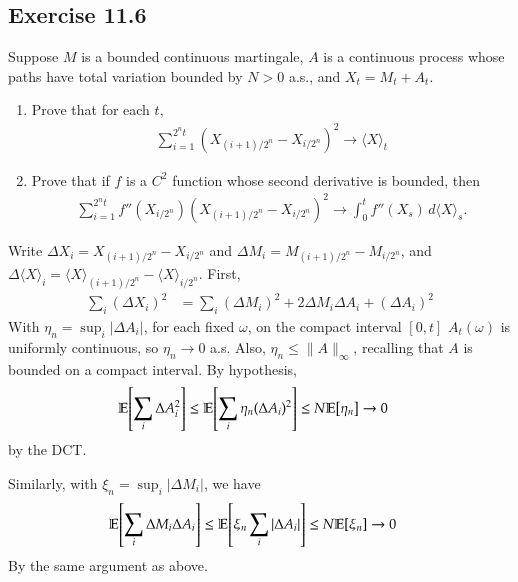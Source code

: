 \documentclass[12pt]{article}
\theoremstyle{definitionstyle}
\newcommand{\mg}[1]{\| #1 \|}
\newcommand{\1}{\mathds 1}
\newcommand{\E}{\mathbb E \qty}
\newcommand{\qv}[1]{\langle #1 \rangle}
\begin{document}
    \subsection*{Exercise 11.6}
    Suppose $M$ is a bounded continuous martingale, $A$ is a continuous process whose paths have total variation bounded by $N > 0$ a.s., and $X_t = M_t + A_t$.
    \begin{enumerate}
        \item Prove that for each $t$,
        \begin{align*}
            \sum_{i=1}^{2^n t} (X_{(i+1)/2^n} - X_{i/2^n})^2 \to \qv{X}_t
        \end{align*}
        \item Prove that if $f$ is a $C^2$ function whose second derivative is bounded, then
        \begin{align*}
            \sum_{i=1}^{2^n t} f''(X_{i/2^n}) (X_{(i+1)/2^n} - X_{i/2^n})^2 \to \int_0^t f''(X_s) \, d\qv{X}_s.
        \end{align*}
    \end{enumerate}

    Write $\Delta X_i = X_{(i+1)/2^n} - X_{i/2^n}$ and $\Delta M_i = M_{(i+1)/2^n} - M_{i/2^n}$, and $\Delta \qv{X}_i = \qv{X}_{(i+1)/2^n} - \qv{X}_{i/2^n}$. First,
    \begin{align*}
        \sum_i (\Delta X_i)^2 &= \sum_i (\Delta M_i)^2 + 2 \Delta M_i \Delta A_i + (\Delta A_i)^2
    \end{align*}
    With $\eta_n = \sup_i |\Delta A_i|$, for each fixed $\omega$, on the compact interval $[0,t]$ $A_t(\omega)$ is uniformly continuous, so $\eta_n \to 0$ a.s. Also, $\eta_n \leq \mg{A}_\infty$, recalling that $A$ is bounded on a compact interval. By hypothesis,
    \begin{align*}
        \E[\sum_i \Delta A_i^2] &\leq \E[\sum_i \eta_n (\Delta A_i)^2] \leq N \E[\eta_n] \to 0
    \end{align*}
    by the DCT. 

    Similarly, with $\xi_n = \sup_i |\Delta M_i|$, we have
    \begin{align*}
        \E[\sum_i \Delta M_i \Delta A_i] &\leq \E[\xi_n \sum_i |\Delta A_i|] \leq N \E[\xi_n] \to 0
    \end{align*}
    By the same argument as above. 
\end{document}
